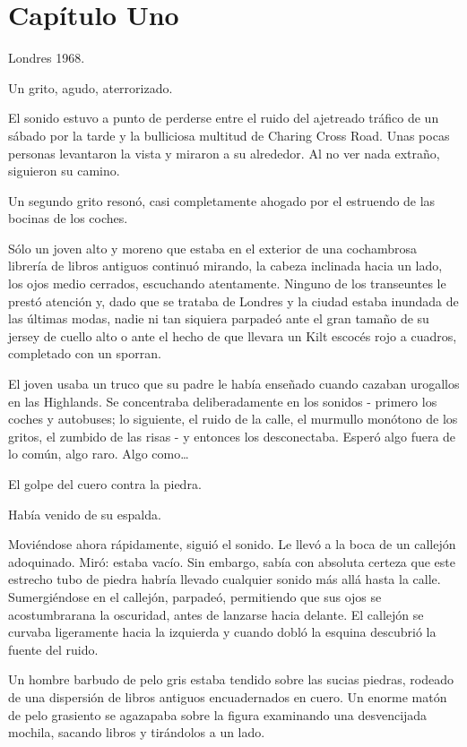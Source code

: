 \chapter*{Capítulo Uno}

Londres 1968.

Un grito, agudo, aterrorizado.

El sonido estuvo a punto de perderse entre el ruido del
ajetreado tráfico de un sábado por la tarde y la bulliciosa multitud de
Charing Cross Road. Unas pocas personas levantaron la vista y miraron a
su alrededor. Al no ver nada extraño, siguieron su camino.

Un segundo grito resonó, casi completamente ahogado por el
estruendo de las bocinas de los coches.

Sólo un joven alto y moreno que estaba en el exterior de una
cochambrosa librería de libros antiguos continuó mirando, la cabeza
inclinada hacia un lado, los ojos medio cerrados, escuchando
atentamente. Ninguno de los transeuntes le prestó atención y, dado que
se trataba de Londres y la ciudad estaba inundada de las últimas modas,
nadie ni tan siquiera parpadeó ante el gran tamaño de su jersey de
cuello alto o ante el hecho de que llevara un Kilt escocés rojo a
cuadros, completado con un sporran.

El joven usaba un truco que su padre le había enseñado cuando
cazaban urogallos en las Highlands. Se concentraba deliberadamente en
los sonidos - primero los coches y autobuses; lo siguiente, el ruido de
la calle, el murmullo monótono de los gritos, el zumbido de las risas -
y entonces los desconectaba. Esperó algo fuera de lo común, algo
raro. Algo como\ldots{}

El golpe del cuero contra la piedra.

Había venido de su espalda.

Moviéndose ahora rápidamente, siguió el sonido. Le llevó a la
boca de un callejón adoquinado. Miró: estaba vacío. Sin embargo, sabía
con absoluta certeza que este estrecho tubo de piedra habría llevado
cualquier sonido más allá hasta la calle. Sumergiéndose en el callejón,
parpadeó, permitiendo que sus ojos se acostumbrarana la oscuridad,
antes de lanzarse hacia delante. El callejón se curvaba ligeramente
hacia la izquierda y cuando dobló la esquina descubrió la fuente del
ruido.

Un hombre barbudo de pelo gris estaba tendido sobre las sucias
piedras, rodeado de una dispersión de libros antiguos encuadernados en
cuero. Un enorme matón de pelo grasiento se agazapaba sobre la figura
examinando una desvencijada mochila, sacando libros y tirándolos a un
lado.

